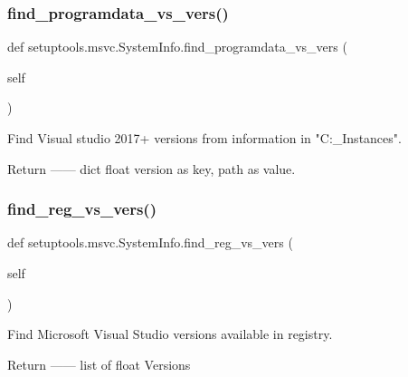 \subsubsection{\texorpdfstring{find\+\_\+programdata\+\_\+vs\+\_\+vers()}{find\_programdata\_vs\_vers()}}
{\footnotesize\ttfamily def setuptools.\+msvc.\+System\+Info.\+find\+\_\+programdata\+\_\+vs\+\_\+vers (\begin{DoxyParamCaption}\item[{}]{self }\end{DoxyParamCaption})}

\begin{DoxyVerb}Find Visual studio 2017+ versions from information in
"C:\ProgramData\Microsoft\VisualStudio\Packages\_Instances".

Return
------
dict
    float version as key, path as value.
\end{DoxyVerb}
 \mbox{\label{classsetuptools_1_1msvc_1_1SystemInfo_a42a64434029bf4c65c33a728e3abdd3a}} 
\subsubsection{\texorpdfstring{find\+\_\+reg\+\_\+vs\+\_\+vers()}{find\_reg\_vs\_vers()}}
{\footnotesize\ttfamily def setuptools.\+msvc.\+System\+Info.\+find\+\_\+reg\+\_\+vs\+\_\+vers (\begin{DoxyParamCaption}\item[{}]{self }\end{DoxyParamCaption})}

\begin{DoxyVerb}Find Microsoft Visual Studio versions available in registry.

Return
------
list of float
    Versions
\end{DoxyVerb}
 \mbox{\label{classsetuptools_1_1msvc_1_1SystemInfo_ac293ac926386145b04dfc6d9c2b5e2e3}} 
